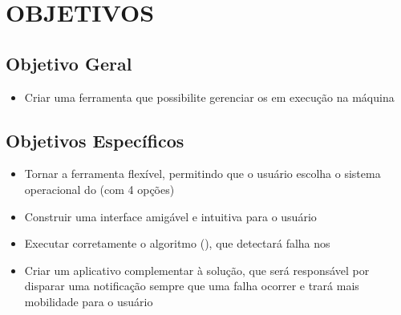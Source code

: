 
\chapter{OBJETIVOS}
\label{chap:objetivos}




\section{Objetivo Geral}
\label{sec:objetivo_geral}

\begin{itemize}
    \item Criar uma ferramenta que possibilite gerenciar os \containers{} em execução na máquina
\end{itemize}




\section{Objetivos Específicos}
\label{sec:objetivos_especificos}

\begin{itemize}
    \item Tornar a ferramenta flexível, permitindo que o usuário escolha o sistema operacional do \conteiner{} (com 4 opções)
    \item Construir uma interface amigável e intuitiva para o usuário
    \item Executar corretamente o algoritmo (\adaptive{}), que detectará falha nos \containers{}
    \item Criar um aplicativo complementar à solução, que será responsável por disparar uma notificação sempre que uma falha ocorrer e trará mais mobilidade para o usuário
\end{itemize}